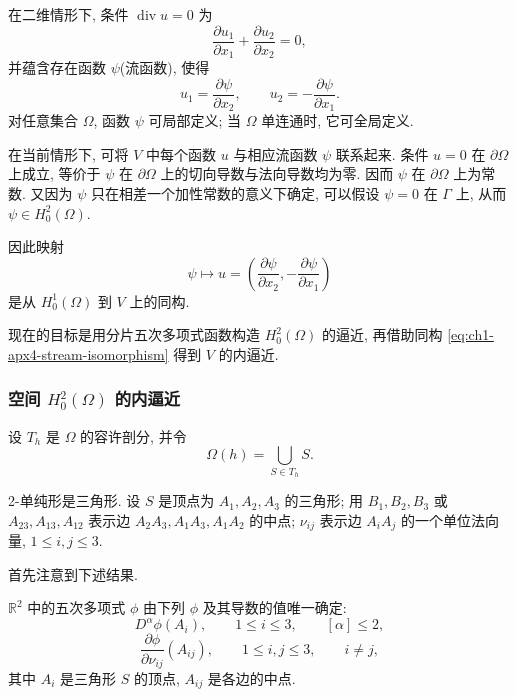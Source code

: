 在二维情形下, 条件 $\operatorname{div}u=0$ 为
\begin{equation}
\frac{\partial u_1}{\partial x_1}+\frac{\partial u_2}{\partial x_2}=0,
\label{eq:ch1-apx4-divergence-free}
\end{equation}
并蕴含存在函数 $\psi$(流函数), 使得
\begin{equation}
u_1=\frac{\partial\psi}{\partial x_2},
\qquad
u_2=-\frac{\partial\psi}{\partial x_1}.
\label{eq:ch1-apx4-stream-function}
\end{equation}
对任意集合 $\Omega$, 函数 $\psi$ 可局部定义; 当 $\Omega$ 单连通时, 它可全局定义.

在当前情形下, 可将 $V$ 中每个函数 $u$ 与相应流函数 $\psi$ 联系起来. 条件 $u=0$ 在 $\partial\Omega$ 上成立, 等价于 $\psi$ 在 $\partial\Omega$ 上的切向导数与法向导数均为零. 因而 $\psi$ 在 $\partial\Omega$ 上为常数. 又因为 $\psi$ 只在相差一个加性常数的意义下确定, 可以假设 $\psi=0$ 在 $\Gamma$ 上, 从而 $\psi\in H_0^2(\Omega)$.

因此映射
\begin{equation}
\psi\longmapsto u=
\left(\frac{\partial\psi}{\partial x_2},
-\frac{\partial\psi}{\partial x_1}\right)
\label{eq:ch1-apx4-stream-isomorphism}
\end{equation}
是从 $H_0^1(\Omega)$ 到 $V$ 上的同构.

现在的目标是用分片五次多项式函数构造 $H_0^2(\Omega)$ 的逼近, 再借助同构 \eqref{eq:ch1-apx4-stream-isomorphism} 得到 $V$ 的内逼近.

\subsubsection*{空间 \texorpdfstring{$H_0^2(\Omega)$}{H02(Omega)} 的内逼近}

设 $T_h$ 是 $\Omega$ 的容许剖分, 并令
\begin{equation}
\Omega(h)=\bigcup_{S\in T_h}S.
\label{eq:ch1-apx4-domain}
\end{equation}

2-单纯形是三角形. 设 $S$ 是顶点为 $A_1,A_2,A_3$ 的三角形; 用 $B_1,B_2,B_3$ 或 $A_{23},A_{13},A_{12}$ 表示边 $A_2A_3,A_1A_3,A_1A_2$ 的中点; $\nu_{ij}$ 表示边 $A_iA_j$ 的一个单位法向量, $1\leq i,j\leq3$.

首先注意到下述结果.

\begin{Lemma}
\label{lem:ch1-quintic-triangle-unisolvence}
$\mathbb R^2$ 中的五次多项式 $\phi$ 由下列 $\phi$ 及其导数的值唯一确定:
\begin{equation}
D^\alpha\phi(A_i),
\qquad 1\leq i\leq3,
\qquad [\alpha]\leq2,
\label{eq:ch1-quintic-vertex-data}
\end{equation}
\begin{equation}
\frac{\partial\phi}{\partial\nu_{ij}}(A_{ij}),
\qquad 1\leq i,j\leq3,
\qquad i\neq j,
\label{eq:ch1-quintic-midpoint-data}
\end{equation}
其中 $A_i$ 是三角形 $S$ 的顶点, $A_{ij}$ 是各边的中点.
\end{Lemma}

